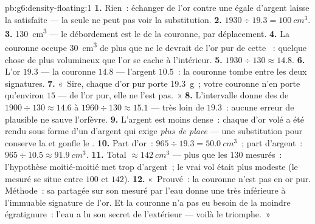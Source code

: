 \begin{solution}{pb:g6:density-floating:1}
\textbf{1.} Rien~: échanger de l'or contre une \emph{} égale
d'argent laisse la  satisfaite --- la  seule ne peut pas
voir la substitution.
\textbf{2.} $1930 \div 19.3 = \qty{100}{cm^3}$.
\textbf{3.} \qty{130}{cm^3} --- le débordement est le  de la
couronne, par déplacement.
\textbf{4.} La couronne occupe \qty{30}{cm^3} de plus que ne le
devrait de l'or pur de cette ~: quelque chose de plus volumineux
que l'or se cache à l'intérieur.
\textbf{5.} $1930 \div 130 \approx 14.8$.
\textbf{6.} L'or $19.3$ --- la couronne $14.8$ --- l'argent $10.5$~:
la couronne tombe entre les deux signatures.
\textbf{7.} «~Sire, chaque  d'or pur porte
\qty{19.3}{g}~; votre couronne n'en porte qu'environ $15$ --- de l'or
pur, elle ne l'est pas.~»
\textbf{8.} L'intervalle donne des  de
$1900 \div 130 \approx 14.6$ à $1960 \div 130 \approx 15.1$ --- très
loin de $19.3$~: aucune erreur de  plausible ne sauve
l'orfèvre.
\textbf{9.} L'argent est moins dense~: chaque  d'or volé a été
rendu sous forme d'un  d'argent qui exige \emph{plus de
place} --- une substitution  pour  conserve la  et
gonfle le .
\textbf{10.} Part d'or~: $965 \div 19.3 = \qty{50.0}{cm^3}$~; part
d'argent~: $965 \div 10.5 \approx \qty{91.9}{cm^3}$.
\textbf{11.} Total $\approx \qty{142}{cm^3}$ --- plus que les $130$
mesurés~: l'hypothèse moitié-moitié met trop d'argent~; le vrai vol
était plus modeste (le  mesuré se situe entre $100$ et $142$).
\textbf{12.} «~Prouvé~: la couronne n'est pas en or pur. Méthode~: sa
 partagée sur son  mesuré par l'eau donne une  très inférieure à l'immuable signature de l'or. Et la
couronne n'a pas eu besoin de la moindre égratignure~: l'eau a lu son
secret de l'extérieur --- voilà le triomphe.~»
\end{solution}
